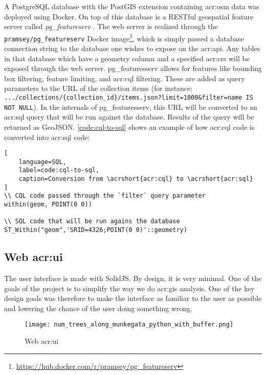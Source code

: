A PostgreSQL database with the PostGIS extension containing \gls{acr:osm} data was deployed using Docker. On top of this database is a RESTful geospatial feature server called \textit{pg\_featureserv} \citep{crunchydataCrunchyDataPg_featureserv2024}. The web server is realized through the \texttt{pramsey/pg\_featureserv} Docker image\footnote{\url{https://hub.docker.com/r/pramsey/pg_featureserv}}, which is simply passed a database connection string to the database one wishes to expose on the \acrshort{acr:api}. Any tables in that database which have a geometry column and a specified \gls{acr:crs} will be exposed through the web server. pg\_featuresserv allows for features like bounding box filtering, feature limiting, and \acrshort{acr:cql} filtering. These are added as query parameters to the URL of the collection items (for instance: \texttt{.../collections/\{collection\_id\}/items.json?limit=1000\&filter=name IS NOT NULL}). In the internals of pg\_featuresserv, this URL will be converted to an \acrshort{acr:sql} query that will be run against the database. Results of the query will be returned as GeoJSON. \autoref{code:cql-to-sql} shows an example of how \acrshort{acr:cql} code is converted into \acrshort{acr:sql} code:

\begin{lstlisting}[
    language=SQL,
    label=code:cql-to-sql,
    caption=Conversion from \acrshort{acr:cql} to \acrshort{acr:sql}
]
\\ CQL code passed through the `filter` query parameter
within(geom, POINT(0 0))

\\ SQL code that will be run agains the database
ST_Within("geom",'SRID=4326;POINT(0 0)'::geometry)
\end{lstlisting}

\subsection[Web UI]{Web \acrshort{acr:ui}}

The user interface is made with SolidJS. By design, it is very minimal. One of the goals of the project is to simplify the way we do \acrshort{acr:gis} analysis. One of the key design goals was therefore to make the interface as familiar to the user as possible and lowering the chance of the user doing something wrong.

\begin{figure}[h]
    \centering
    \texttt{[image: num\_trees\_along\_munkegata\_python\_with\_buffer.png]}
    \caption{Web \acrshort{acr:ui}}
    \label{fig:web-ui}
\end{figure}

